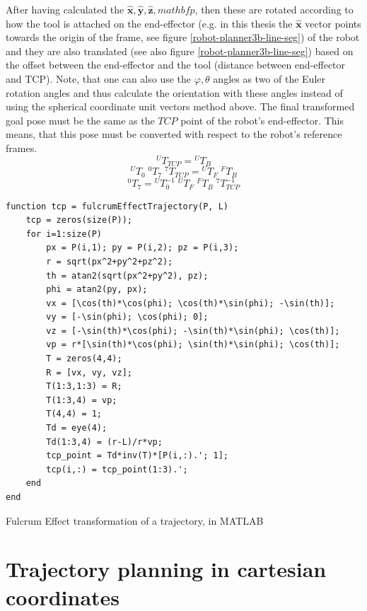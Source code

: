 After having calculated the $\hat{\mathbf{x}},\hat{\mathbf{y}},\hat{\mathbf{z}},mathbf{p}$, then these are rotated according to how the tool is attached on the end-effector (e.g. in this thesis the $\hat{\mathbf{x}}$ vector 
points towards the origin of the frame, see figure \ref{robot-planner3b-line-seg}) of the robot and they are also translated (see also figure \ref{robot-planner3b-line-seg})
based on the offset between the end-effector and the tool (distance between end-effector and TCP). Note, that one can also use the $φ,θ$ angles as two of the Euler rotation angles and thus calculate the orientation 
with these angles instead of using the spherical coordinate unit vectors method above.
The final transformed goal pose must be the same as the $TCP$ point of the robot's end-effector. This means, that this pose must be converted with respect to the robot's reference frames.
\[
{}^{U}T^{}_{TCP} = {}^{U}T^{}_{B}
\]
\[
{}^{U}T^{}_{0} \; {}^{0}T^{}_{7} \; {}^{7}T^{}_{TCP} = {}^{U}T^{}_{F} \; {}^{F}T^{}_{B}
\]
\begin{equation}
{}^{0}T^{}_{7} = {}^{U}T^{-1}_{0} \; {}^{U}T^{}_{F} \; {}^{F}T^{}_{B} \; {}^{7}T^{-1}_{TCP}
\end{equation}

\begin{listing}[H]
\begin{verbatim}
function tcp = fulcrumEffectTrajectory(P, L)
    tcp = zeros(size(P));
    for i=1:size(P)
        px = P(i,1); py = P(i,2); pz = P(i,3);
        r = sqrt(px^2+py^2+pz^2);
        th = atan2(sqrt(px^2+py^2), pz);
        phi = atan2(py, px);
        vx = [\cos(th)*\cos(phi); \cos(th)*\sin(phi); -\sin(th)];
        vy = [-\sin(phi); \cos(phi); 0];
        vz = [-\sin(th)*\cos(phi); -\sin(th)*\sin(phi); \cos(th)];
        vp = r*[\sin(th)*\cos(phi); \sin(th)*\sin(phi); \cos(th)];
        T = zeros(4,4);
        R = [vx, vy, vz];
        T(1:3,1:3) = R;
        T(1:3,4) = vp;
        T(4,4) = 1;
        Td = eye(4);
        Td(1:3,4) = (r-L)/r*vp;
        tcp_point = Td*inv(T)*[P(i,:).'; 1];
        tcp(i,:) = tcp_point(1:3).';
    end
end
\end{verbatim}
\caption{Fulcrum Effect transformation of a trajectory, in MATLAB}
\label{code:fulcrum_effect_traj_matlab}
\end{listing}


\section{Trajectory planning in cartesian coordinates}
\label{section:pivot-motions}

